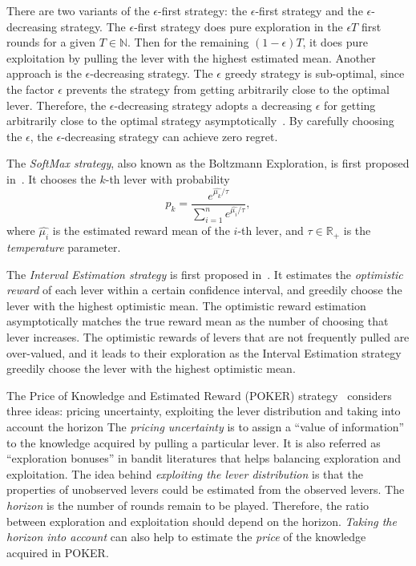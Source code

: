 There are two variants of the $\epsilon$-first strategy: the $\epsilon$-first strategy and the $\epsilon$-decreasing strategy.
The $\epsilon$-first strategy does pure exploration in the $\epsilon T$ first rounds for a given $T \in \mathbb{N}$.
Then for the remaining $(1 - \epsilon ) T$, it does pure exploitation by pulling the lever with the highest estimated mean.
Another approach is the $\epsilon$-decreasing strategy.
The $\epsilon$ greedy strategy is sub-optimal,
since the factor $\epsilon$ prevents the strategy from getting arbitrarily close to the optimal lever.
Therefore, the $\epsilon$-decreasing strategy adopts a decreasing $\epsilon$ 
for getting arbitrarily close to the optimal strategy asymptotically~\cite{Vermorel:2005:MAB}.
By carefully choosing the $\epsilon$, the $\epsilon$-decreasing strategy can achieve zero regret.

The \textit{SoftMax strategy}, also known as the Boltzmann Exploration, is first proposed in~\cite{Luce:1959:softmax}.
It chooses the $k$-th lever with probability
\begin{displaymath}
p_k = \frac{ e^{ \hat{ \mu_k } / \tau } }{ \sum_{i=1}^{n} e^{ \hat{ \mu_i } / \tau } },
\end{displaymath}
where $\hat{\mu_i}$ is the estimated reward mean of the $i$-th lever,
and $\tau \in \mathbb{R}_+$ is the \textit{temperature} parameter.


The \textit{Interval Estimation strategy} is first proposed in~\cite{Kaelbling:1993:interval_estimation}.
It estimates the \textit{optimistic reward} of each lever within a certain confidence interval,
and greedily choose the lever with the highest optimistic mean.
The optimistic reward estimation asymptotically matches the true reward mean as the number of choosing that lever increases.
The optimistic rewards of levers that are not frequently pulled are over-valued, 
and it leads to their exploration as the Interval Estimation strategy greedily choose the lever with the highest optimistic mean.

The Price of Knowledge and Estimated Reward (POKER) strategy~\cite{Vermorel:2005:MAB}
considers three ideas: pricing uncertainty, exploiting the lever distribution and taking into account the horizon
The \textit{pricing uncertainty} is to assign a ``value of information'' to the knowledge acquired by pulling a particular lever.
It is also referred as ``exploration bonuses'' in bandit literatures that helps balancing exploration and exploitation.
The idea behind \textit{exploiting the lever distribution} is that
the properties of unobserved levers could be estimated from the observed levers.
The \textit{horizon} is the number of rounds remain to be played.
Therefore, the ratio between exploration and exploitation should depend on the horizon.
\textit{Taking the horizon into account} can also help to estimate the \textit{price} of the knowledge acquired in POKER.

